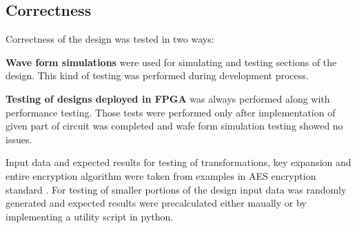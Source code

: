 \subsection{Correctness}
Correctness of the design was tested in two ways:
\begin{description}
\item {\textbf{Wave form simulations}} were used for simulating and testing sections of the design. This kind of testing was performed during development process.
\item {\textbf{Testing of designs deployed in FPGA}} was always performed along with performance testing. Those tests were performed only after implementation of given part of circuit was completed and wafe form simulation testing showed no issues.
\end{description}

Input data and expected results for testing of transformations, key expansion and entire encryption algorithm were taken from examples in AES encryption standard \cite{aes-standard}. For testing of smaller portions of the design input data was randomly generated and expected results were precalculated either maually or by implementing a utility script in python.
